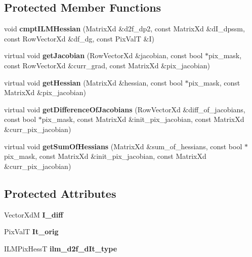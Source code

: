 \subsection*{Protected Member Functions}
\begin{DoxyCompactItemize}
\item 
\hypertarget{classSSDBase_a19731264a5de6d4d115e3e5f5adba346}{void {\bfseries cmpt\-I\-L\-M\-Hessian} (Matrix\-Xd \&d2f\-\_\-dp2, const Matrix\-Xd \&d\-I\-\_\-dpssm, const Row\-Vector\-Xd \&df\-\_\-dg, const Pix\-Val\-T \&I)}\label{classSSDBase_a19731264a5de6d4d115e3e5f5adba346}

\item 
\hypertarget{classSSDBase_aa165890c3f05068493c9dc6140727966}{virtual void {\bfseries get\-Jacobian} (Row\-Vector\-Xd \&jacobian, const bool $\ast$pix\-\_\-mask, const Row\-Vector\-Xd \&curr\-\_\-grad, const Matrix\-Xd \&pix\-\_\-jacobian)}\label{classSSDBase_aa165890c3f05068493c9dc6140727966}

\item 
\hypertarget{classSSDBase_ab25a298448260c79707790030abe5dda}{virtual void {\bfseries get\-Hessian} (Matrix\-Xd \&hessian, const bool $\ast$pix\-\_\-mask, const Matrix\-Xd \&pix\-\_\-jacobian)}\label{classSSDBase_ab25a298448260c79707790030abe5dda}

\item 
\hypertarget{classSSDBase_ad8dccd2f3e9d0cc85d46dc0ce644b222}{virtual void {\bfseries get\-Difference\-Of\-Jacobians} (Row\-Vector\-Xd \&diff\-\_\-of\-\_\-jacobians, const bool $\ast$pix\-\_\-mask, const Matrix\-Xd \&init\-\_\-pix\-\_\-jacobian, const Matrix\-Xd \&curr\-\_\-pix\-\_\-jacobian)}\label{classSSDBase_ad8dccd2f3e9d0cc85d46dc0ce644b222}

\item 
\hypertarget{classSSDBase_a149f57ead52f40266c7cdca85b094f3d}{virtual void {\bfseries get\-Sum\-Of\-Hessians} (Matrix\-Xd \&sum\-\_\-of\-\_\-hessians, const bool $\ast$pix\-\_\-mask, const Matrix\-Xd \&init\-\_\-pix\-\_\-jacobian, const Matrix\-Xd \&curr\-\_\-pix\-\_\-jacobian)}\label{classSSDBase_a149f57ead52f40266c7cdca85b094f3d}

\end{DoxyCompactItemize}
\subsection*{Protected Attributes}
\begin{DoxyCompactItemize}
\item 
\hypertarget{classSSDBase_a55ca7b55d2574a468b404ee7603737b4}{Vector\-Xd\-M {\bfseries I\-\_\-diff}}\label{classSSDBase_a55ca7b55d2574a468b404ee7603737b4}

\item 
\hypertarget{classSSDBase_ae4542cbbd689997d9fef5968ce078b6d}{Pix\-Val\-T {\bfseries It\-\_\-orig}}\label{classSSDBase_ae4542cbbd689997d9fef5968ce078b6d}

\item 
\hypertarget{classSSDBase_a4f1f3e4f394d2c730d4e247e3ead9074}{I\-L\-M\-Pix\-Hess\-T {\bfseries ilm\-\_\-d2f\-\_\-d\-It\-\_\-type}}\label{classSSDBase_a4f1f3e4f394d2c730d4e247e3ead9074}

\end{DoxyCompactItemize}



